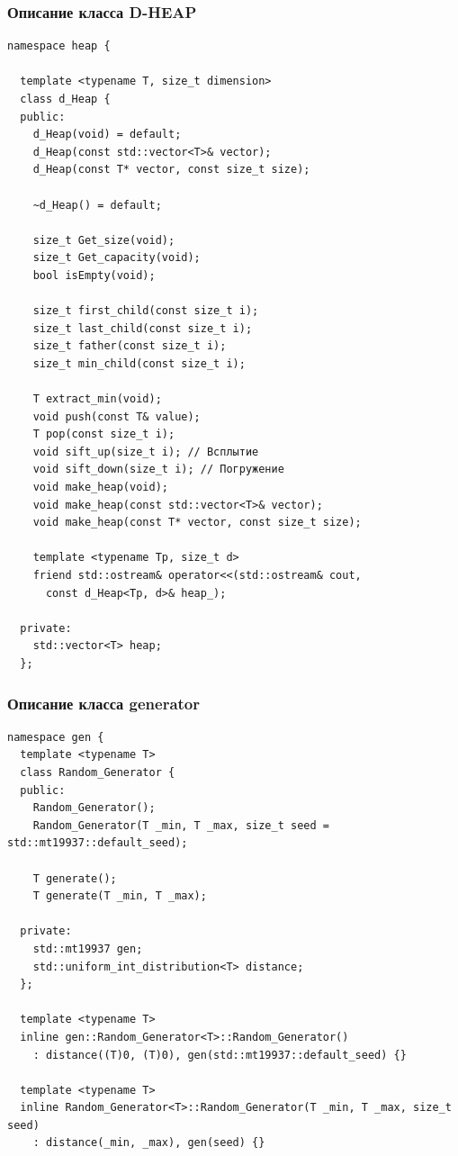\begin{text}
\subsubsection{Описание класса D-HEAP}


\begin{lstlisting}[breaklines=true]
namespace heap {

  template <typename T, size_t dimension>
  class d_Heap {
  public:
    d_Heap(void) = default;
    d_Heap(const std::vector<T>& vector);
    d_Heap(const T* vector, const size_t size);

    ~d_Heap() = default;

    size_t Get_size(void);
    size_t Get_capacity(void);
    bool isEmpty(void);

    size_t first_child(const size_t i);
    size_t last_child(const size_t i);
    size_t father(const size_t i);
    size_t min_child(const size_t i);

    T extract_min(void);
    void push(const T& value);
    T pop(const size_t i);
    void sift_up(size_t i); // Всплытие 
    void sift_down(size_t i); // Погружение
    void make_heap(void);
    void make_heap(const std::vector<T>& vector);
    void make_heap(const T* vector, const size_t size);

    template <typename Tp, size_t d>
    friend std::ostream& operator<<(std::ostream& cout,
      const d_Heap<Tp, d>& heap_);

  private:
    std::vector<T> heap;
  };
\end{lstlisting}
\newpage
\subsubsection{Описание класса generator}

\begin{lstlisting}[breaklines=true]
	namespace gen {
  template <typename T>
  class Random_Generator {
  public:
    Random_Generator();
    Random_Generator(T _min, T _max, size_t seed = std::mt19937::default_seed);

    T generate();
    T generate(T _min, T _max);

  private:
    std::mt19937 gen;
    std::uniform_int_distribution<T> distance;
  };

  template <typename T>
  inline gen::Random_Generator<T>::Random_Generator()
    : distance((T)0, (T)0), gen(std::mt19937::default_seed) {}

  template <typename T>
  inline Random_Generator<T>::Random_Generator(T _min, T _max, size_t seed)
    : distance(_min, _max), gen(seed) {}


\end{lstlisting}
\end{text}
